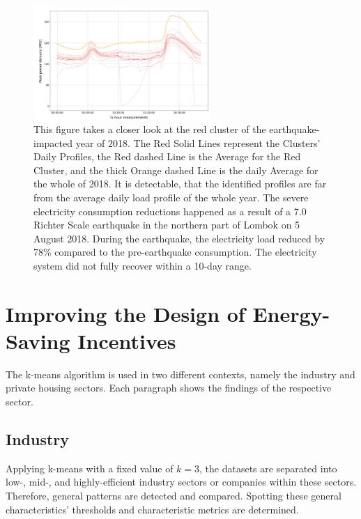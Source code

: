 \begin{figure}[H]
    \centering
    \includegraphics[width=0.6\textwidth]{figures/jessen_ndImpactedClusters/jessen_ClusterTwo2018.png}
    \caption{This figure takes a closer look at the red cluster of the earthquake-impacted year of 2018.
    The Red Solid Lines represent the Clusters' Daily Profiles, the Red dashed Line is the Average for the Red Cluster, and the thick Orange dashed Line is the daily Average for the whole of 2018.
    It is detectable, that the identified profiles are far from the average daily load profile of the whole year.
    The severe electricity consumption reductions happened as a result of a 7.0 Richter Scale earthquake in the northern part of Lombok on 5 August 2018.
    During the earthquake, the electricity load reduced by 78\% compared to the pre-earthquake consumption.
    The electricity system did not fully recover within a 10-day range.
    }
    \label{fig:clustering_results_2018_cluster_two}
\end{figure}

\section{Improving the Design of Energy-Saving Incentives}
\label{sec:improving_the_design_of_energy_saving_incentives}
The k-means algorithm is used in two different contexts, namely the industry and private housing sectors.
Each paragraph shows the findings of the respective sector.
\subsection{Industry}
Applying k-means with a fixed value of $k=3$, the datasets are separated into low-, mid-, and highly-efficient industry sectors or companies within these sectors.
Therefore, general patterns are detected and compared.
Spotting these general characteristics' thresholds and characteristic metrics are determined.

